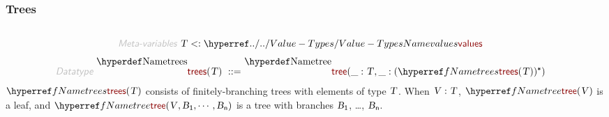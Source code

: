 \subsubsection*{Trees}\hypertarget{trees}{}\label{trees}

\begin{align*}
  [ ~ 
  \KEY{Datatype} ~ & \NAMEREF{trees} \\
  \KEY{Funcon} ~ & \NAMEREF{tree} \\
  \KEY{Funcon} ~ & \NAMEREF{tree-root-value} \\
  \KEY{Funcon} ~ & \NAMEREF{tree-branch-sequence} \\
  \KEY{Funcon} ~ & \NAMEREF{single-branching-sequence} \\
  \KEY{Funcon} ~ & \NAMEREF{forest-root-value-sequence} \\
  \KEY{Funcon} ~ & \NAMEREF{forest-branch-sequence} \\
  \KEY{Funcon} ~ & \NAMEREF{forest-value-sequence}
  ~ ]
\end{align*}
\begin{align*}
  \KEY{Meta-variables} ~ 
  & \VAR{T} <: \NAMEHYPER{../..}{Value-Types}{values}
\end{align*}
\begin{align*}
  \KEY{Datatype} ~ 
  \NAMEDECL{trees}(\VAR{T} )  
  ~ ::= ~ & \NAMEDECL{tree} (\_ : \VAR{T}, \_ : ( \NAMEREF{trees}
                                           ( \VAR{T} ) )\STAR)
\end{align*}
$\SHADE{\NAMEREF{trees}
           ( \VAR{T} )}$ consists of finitely-branching trees with elements of type $\SHADE{\VAR{T}}$.
  When $\SHADE{\VAR{V} : \VAR{T}}$, $\SHADE{\NAMEREF{tree}
           ( \VAR{V} )}$ is a leaf, and $\SHADE{\NAMEREF{tree}
           ( \VAR{V},   
             \VAR{B}\SUB{1},   
             \cdots,   
             \VAR{B}\SUB{n} )}$ is a tree with
  branches $\SHADE{\VAR{B}\SUB{1}}$, \ldots{}, $\SHADE{\VAR{B}\SUB{n}}$.

